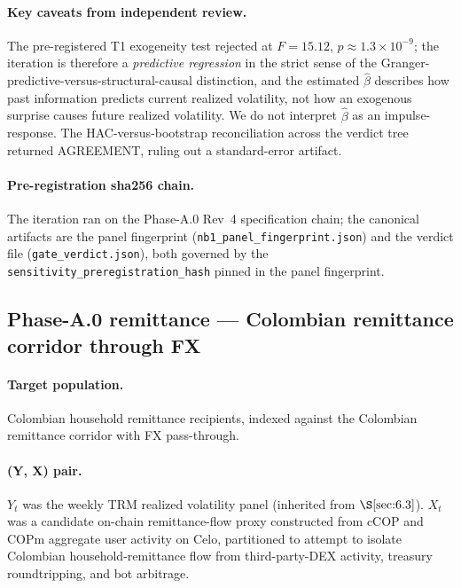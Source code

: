 \paragraph{Key caveats from independent review.} The pre-registered
T1 exogeneity test rejected at \(F = 15.12\),
\(p \approx 1.3 \times 10^{-9}\); the iteration is therefore a
\emph{predictive regression} in the strict sense of the
Granger-predictive-versus-structural-causal distinction, and the
estimated \(\hat{\beta}\) describes how past information predicts
current realized volatility, not how an exogenous surprise causes
future realized volatility. We do not interpret \(\hat{\beta}\) as an
impulse-response. The HAC-versus-bootstrap reconciliation across the
verdict tree returned AGREEMENT, ruling out a standard-error artifact.

\paragraph{Pre-registration sha256 chain.} The iteration ran on the
Phase-A.0 Rev~4 specification chain; the canonical artifacts are the
panel fingerprint
(\texttt{nb1\_panel\_fingerprint.json}) and the verdict file
(\texttt{gate\_verdict.json}), both governed by the
\texttt{sensitivity\_preregistration\_hash} pinned in the panel
fingerprint.

\subsection{Phase-A.0 remittance --- Colombian remittance corridor through
FX}\label{sec:6.4}

\paragraph{Target population.} Colombian household remittance recipients,
indexed against the Colombian remittance corridor with FX pass-through.

\paragraph{(Y, X) pair.} \(Y_t\) was the weekly TRM realized volatility
panel (inherited from \(\S\ref{sec:6.3}\)). \(X_t\) was a candidate
on-chain remittance-flow proxy constructed from cCOP and COPm aggregate
user activity on Celo, partitioned to attempt to isolate Colombian
household-remittance flow from third-party-DEX activity, treasury
roundtripping, and bot arbitrage.

